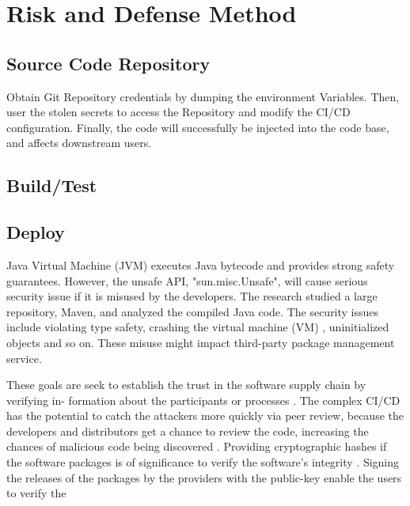 \section{Risk and Defense Method}

\subsection{Source Code Repository}
Obtain Git Repository credentials by dumping the environment Variables. Then, user
the stolen secrets to access the Repository and modify the CI/CD configuration.
Finally, the code will successfully be injected into the code base, and affects
downstream users.

\subsection{Build/Test}
\subsection{Deploy}
Java Virtual Machine (JVM) executes Java bytecode and provides strong safety
guarantees. However, the unsafe API, "sun.misc.Unsafe", will cause serious 
security issue if it is misused by the developers. The research \cite{mastrangelo2015use} 
studied a large repository, Maven, and analyzed the compiled Java code. The 
security issues include violating type safety, crashing the virtual machine (VM)
, uninitialized objects and so on. These misuse might impact third-party package 
management service. 


These goals are seek to establish the trust in the software supply chain by verifying in-
formation about the participants or processes \cite{melara2022software}.
The complex CI/CD has the potential to catch the attackers more quickly via peer review, 
because the developers and distributors get a chance to review the code, increasing
the chances of malicious code being discovered \cite{levy2003poisoning}.
Providing cryptographic hashes if the software packages is of significance to
verify the software's integrity \cite{levy2003poisoning}.
Signing the releases of the packages by the providers with the public-key enable the 
users to verify the 

